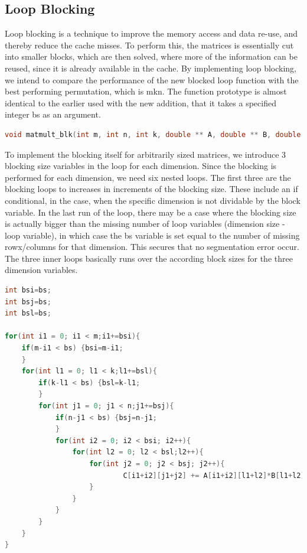 \subsection{Loop Blocking}

Loop blocking is a technique to improve the memory access and data re-use, and thereby reduce the cache misses. To perform this, the matrices is essentially cut into smaller blocks, which are then solved, where more of the information can be reused, since it is already available in the cache. By implementing loop blocking, we intend to compare the performance of the new blocked loop function with the best performing permutation, which is mkn. The function prototype is almost identical to the earlier used with the new addition, that it takes a specified integer bs as an argument.

\begin{lstlisting}[language=C++, caption=Function Prototype]
void matmult_blk(int m, int n, int k, double ** A, double ** B, double ** C, int bs)
\end{lstlisting}

To implement the blocking itself for arbitrarily sized matrices, we introduce 3 blocking size variables in the loop for each dimension. Since the blocking is performed for each dimension, we need six nested loops. The first three are the blocking loops to increases in increments of the blocking size. These include an if conditional, in the case, when the specific dimension is not dividable by the block variable. In the last run of the loop, there may be a case where the blocking size is actually bigger than the missing number of loop variables (dimension size - loop variable), in which case the bs variable is set equal to the number of missing rowx/columns for that dimension. This secures that no segmentation error occur.\\

The three inner loops basically runs over the according block sizes for the three dimension variables.

\begin{lstlisting}[language=C++, caption=Function Prototype]
int bsi=bs;
int bsj=bs;
int bsl=bs;

for(int i1 = 0; i1 < m;i1+=bsi){
	if(m-i1 < bs) {bsi=m-i1;
	}
	for(int l1 = 0; l1 < k;l1+=bsl){
		if(k-l1 < bs) {bsl=k-l1;
		}
		for(int j1 = 0; j1 < n;j1+=bsj){
			if(n-j1 < bs) {bsj=n-j1;
			}
			for(int i2 = 0; i2 < bsi; i2++){	
				for(int l2 = 0; l2 < bsl;l2++){	
					for(int j2 = 0; j2 < bsj; j2++){	
							C[i1+i2][j1+j2] += A[i1+i2][l1+l2]*B[l1+l2][j1+j2];
					}
				}
			}
		}
	}
}
\end{lstlisting}

